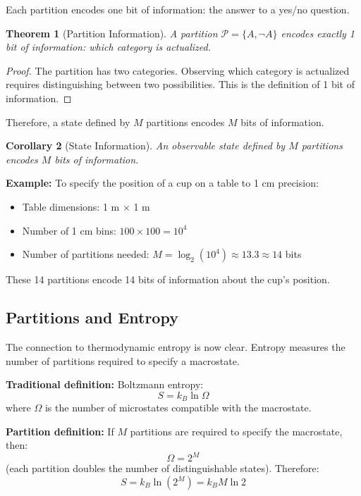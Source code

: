 \documentclass[twocolumn,10pt]{article}
\newtheorem{theorem}{Theorem}[section]
\newtheorem{corollary}[theorem]{Corollary}
\theoremstyle{definition}
\theoremstyle{remark}
\begin{document}
Each partition encodes one bit of information: the answer to a yes/no question.

\begin{theorem}[Partition Information]
\label{thm:partition_information}
A partition $\mathcal{P} = \{A, \neg A\}$ encodes exactly 1 bit of information: which category is actualized.
\end{theorem}

\begin{proof}
The partition has two categories. Observing which category is actualized requires distinguishing between two possibilities. This is the definition of 1 bit of information.
\end{proof}

\noindent Therefore, a state defined by $M$ partitions encodes $M$ bits of information.

\begin{corollary}[State Information]
\label{cor:state_information}
An observable state defined by $M$ partitions encodes $M$ bits of information.
\end{corollary}

\noindent\textbf{Example:} To specify the position of a cup on a table to 1 cm precision:
\begin{itemize}
\item Table dimensions: 1 m × 1 m
\item Number of 1 cm bins: $100 \times 100 = 10^4$
\item Number of partitions needed: $M = \log_2(10^4) \approx 13.3 \approx 14$ bits
\end{itemize}

\noindent These 14 partitions encode 14 bits of information about the cup's position.

\subsection{Partitions and Entropy}

The connection to thermodynamic entropy is now clear. Entropy measures the number of partitions required to specify a macrostate.

\vspace{0.2cm}
\noindent\textbf{Traditional definition:} Boltzmann entropy:
\begin{equation}
S = k_B \ln \Omega
\end{equation}
where $\Omega$ is the number of microstates compatible with the macrostate.

\vspace{0.2cm}
\noindent\textbf{Partition definition:} If $M$ partitions are required to specify the macrostate, then:
\begin{equation}
\Omega = 2^M
\end{equation}
(each partition doubles the number of distinguishable states). Therefore:
\begin{equation}
S = k_B \ln(2^M) = k_B M \ln 2
\end{equation}
\end{document}
